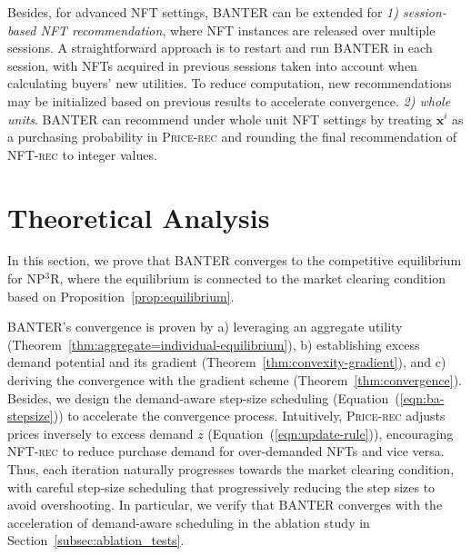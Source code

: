 \documentclass[conference]{IEEEtran}
\theoremstyle{plain}
\begin{document}
{    Besides, for advanced NFT settings, BANTER\xspace can be extended for \textit{1) session-based NFT recommendation}, where NFT instances are released over multiple sessions. A straightforward approach is to restart and run BANTER\xspace in each session, with NFTs acquired in previous sessions taken into account when calculating buyers' new utilities. To reduce computation, new recommendations may be initialized based on previous results to accelerate convergence. \textit{2) whole units}. BANTER\xspace can recommend under whole unit NFT settings by treating $\mathbf{x}^i$ as a purchasing probability in \textsc{Price-rec}\xspace and rounding the final recommendation of \textsc{NFT-rec}\xspace to integer values.

}
\section{Theoretical Analysis}
\label{sec:theory}
In this section, we prove that BANTER\xspace converges to the competitive equilibrium for NP$^3$R\xspace, where the equilibrium is connected to the market clearing condition based on Proposition~\ref{prop:equilibrium}. 

BANTER\xspace's convergence is proven by a) leveraging an aggregate utility (Theorem~\ref{thm:aggregate=individual-equilibrium}), b) establishing excess demand potential and its gradient (Theorem~\ref{thm:convexity-gradient}), and c) deriving the convergence with the gradient scheme (Theorem~\ref{thm:convergence}). Besides, we design the demand-aware step-size scheduling (Equation~(\ref{eqn:ba-stepsize})) to accelerate the convergence process. Intuitively, \textsc{Price-rec}\xspace adjusts prices inversely to excess demand $z$ (Equation~(\ref{eqn:update-rule})), encouraging \textsc{NFT-rec}\xspace to reduce purchase demand for over-demanded NFTs and vice versa. Thus, each iteration naturally progresses towards the market clearing condition, with careful step-size scheduling that progressively reducing the step sizes to avoid overshooting. In particular, we verify that BANTER\xspace converges with the acceleration of demand-aware scheduling in the ablation study in Section~\ref{subsec:ablation_tests}.
\end{document}
